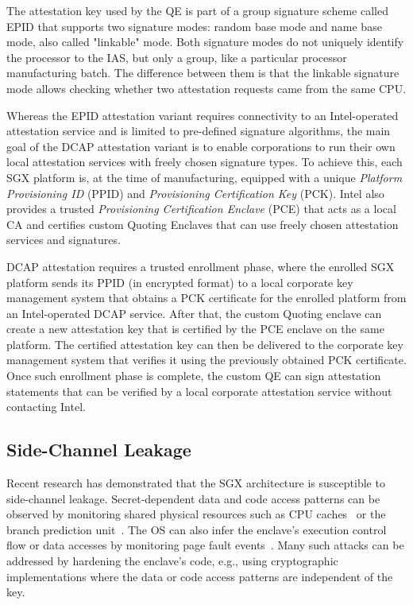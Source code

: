 The attestation key used by the QE is part of a group signature scheme called EPID that supports two signature modes: random base mode and name base mode, also called "linkable" mode. Both signature modes do not uniquely identify the processor to the IAS, but only a group, like a particular processor manufacturing batch. The difference between them is that the linkable signature mode allows checking whether two attestation requests came from the same CPU. 


 Whereas the EPID attestation variant requires connectivity to an Intel-operated attestation service and is limited to pre-defined signature algorithms, the main goal of the DCAP attestation variant is to enable corporations to run their own local attestation services with freely chosen signature types. To achieve this, each SGX platform is, at the time of manufacturing, equipped with a unique \emph{Platform Provisioning ID} (PPID) and \emph{Provisioning Certification Key} (PCK). Intel also provides a trusted \emph{Provisioning Certification Enclave} (PCE) that acts as a local CA and certifies custom Quoting Enclaves that can use freely chosen attestation services and signatures.

DCAP attestation requires a trusted enrollment phase, where the enrolled SGX platform sends its PPID (in encrypted format) to a local corporate key management system that obtains a PCK certificate for the enrolled platform from an Intel-operated DCAP service. After that, the custom Quoting enclave can create a new attestation key that is certified by the PCE enclave on the same platform. The certified attestation key can then be delivered to the corporate key management system that verifies it using the previously obtained PCK certificate. Once such enrollment phase is complete, the custom QE can sign attestation statements that can be verified by a local corporate attestation service without contacting Intel.



\subsection{Side-Channel Leakage}
\label{sec:background:attacks}

Recent research has demonstrated that the SGX architecture is susceptible to side-channel leakage. Secret-dependent data and code access patterns can be observed by monitoring shared physical resources such as CPU caches~\cite{brasser2017software,gotzfried2017cache,moghimi2017cachezoom} or the branch prediction unit~\cite{lee2017inferring}. The OS can also infer the enclave's execution control flow or data accesses by monitoring page fault events~\cite{xu2015controlled}. Many such attacks can be addressed by hardening the enclave's code, e.g., using cryptographic implementations where the data or code access patterns are independent of the key.

